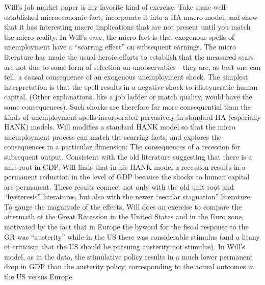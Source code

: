 \documentclass[\econtexRoot/Letter]{subfiles}
\begin{document}
\notinsubfile{\renewcommand{\econtexRoot}{.}}

\hypertarget{job-market-paper}{}
\notinsubfile{\label{sec:job-market-paper}}


Will's job market paper is my favorite kind of exercise: Take some well-established microeconomic fact, incorporate it into a HA macro model, and show that it has interesting macro implications that are not present until you match the micro reality. In Will's case, the micro fact is that exogenous spells of unemployment have a ``scarring effect'' on subsequent earnings. The micro literature has made the usual heroic efforts to establish that the measured scars are not due to some form of selection on unobservables - they are, as best one can tell, a causal consequence of an exogenous unemployment shock.  The simplest interpretation is that the spell results in a negative shock to idiosyncratic human capital.  (Other explanations, like a job ladder or match quality, would have the same consequences).  Such shocks are therefore far more consequential than the kinds of unemployment spells incorporated pervasively in standard HA (especially HANK) models.  Will modifies a standard HANK model so that the micro unemployment process can match the scarring facts, and explores the consequences in a particular dimension: The consequences of a recession for subsequent output.  Consistent with the old literature suggesting that there is a unit root in GDP, Will finds that in his HANK model a recession results in a permanent reduction in the level of GDP because the shocks to human capital are permanent. These results connect not only with the old unit root and ``hysteresis'' literatures, but also with the newer ``secular stagnation'' literature.  To gauge the magnitude of the effects, Will does an exercise to compare the aftermath of the Great Recession in the United States and in the Euro zone, motivated by the fact that in Europe the byword for the fiscal response to the GR was ``austerity'' while in the US there was considerable stimulus (and a litany of criticism that the US should be pursuing austerity not stimulus). In Will's model, as in the data, the stimulative policy results in a much lower permanent drop in GDP than the austerity policy, corresponding to the actual outcomes in the US versus Europe.
\end{document}
